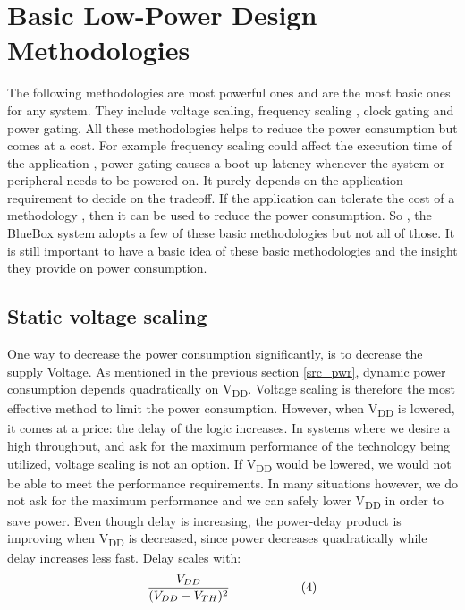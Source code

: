 \section{Basic Low-Power Design Methodologies}
 The following methodologies are most powerful ones and are the most basic ones for any system. They include voltage scaling, frequency scaling , clock gating and power gating. All these methodologies helps to reduce the power consumption but comes at a cost. For example frequency scaling could affect the execution time of the application , power gating causes a boot up latency whenever the system or peripheral needs to be powered on. It purely depends on the application requirement to decide on the tradeoff. If the application can tolerate the cost of a methodology , then it can be used to reduce the power consumption. So , the BlueBox system adopts a few of these basic methodologies but not all of those. It is still important to have a basic idea of these basic methodologies and the insight they provide on power consumption. 
 
 \subsection{Static voltage scaling}
 One way to decrease the power consumption significantly, is to decrease the supply 
 Voltage. As mentioned in the previous section \ref{src_pwr},  dynamic power consumption depends quadratically 
 on V\textsubscript{DD}. Voltage scaling is therefore the most effective method to limit the power 
 consumption. However, when V\textsubscript{DD} is lowered, it comes at a price: the delay of the logic 
 increases. In systems where we desire a high throughput, and ask for the maximum 
 performance of the technology being utilized, voltage scaling is not an option. If V\textsubscript{DD} 
 would be lowered, we would not be able to meet the performance requirements. In many 
 situations however, we do not ask for the maximum performance and we can safely lower 
V\textsubscript{DD} in order to save power. Even though delay is increasing, the power-delay product 
 is improving when V\textsubscript{DD} is decreased, since power decreases quadratically while delay 
 increases less fast. Delay scales with:
 \vspace*{-2mm}
 \[ \frac{V_{DD}}{
 	(V_{DD} - V_{TH})^2
 	} \hspace{20mm}(4)\]     
 
